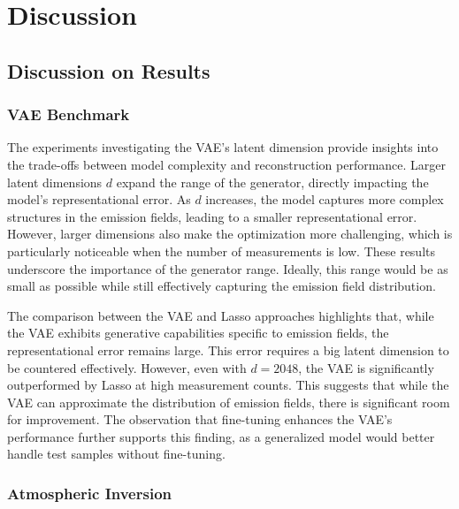
\chapter{Discussion}\label{chapter:discussion}

\section{Discussion on Results}

\subsection{VAE Benchmark}

The experiments investigating the \gls{VAE}'s latent dimension provide insights into the trade-offs between model complexity and reconstruction performance.
Larger latent dimensions $d$ expand the range of the generator, directly impacting the model's representational error.
As $d$ increases, the model captures more complex structures in the emission fields, leading to a smaller representational error.
However, larger dimensions also make the optimization more challenging, which is particularly noticeable when the number of measurements is low. 
These results underscore the importance of the generator range.
Ideally, this range would be as small as possible while still effectively capturing the emission field distribution.

The comparison between the \gls{VAE} and \gls{Lasso} approaches highlights that, while the \gls{VAE} exhibits generative capabilities specific to emission fields, the representational error remains large.
This error requires a big latent dimension to be countered effectively.
However, even with $d = 2048$, the \gls{VAE} is significantly outperformed by \gls{Lasso} at high measurement counts.
This suggests that while the \gls{VAE} can approximate the distribution of emission fields, there is significant room for improvement.
The observation that fine-tuning enhances the \gls{VAE}'s performance further supports this finding, as a generalized model would better handle test samples without fine-tuning.

\subsection{Atmospheric Inversion}

